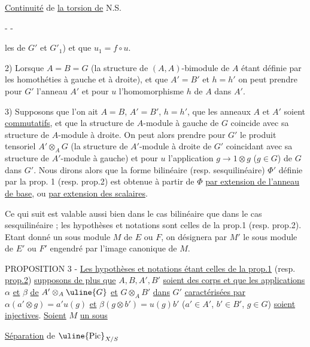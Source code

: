 \uline{Continuité} de \uline{la torsion de} N.S.


-  -

les de $G'$ et $G'_1$) et que $u_1=f\circ u$.

2) Lorsque $A=B=G$ (la structure de $(A,A)$-bimodule de $A$ étant définie par les homothéties à gauche et à droite), et que $A'=B'$ et $h=h'$ on peut prendre pour $G'$ l'anneau $A'$ et pour $u$ l'homomorphisme $h$ de $A$ dans $A'$.

3) Supposons que l'on ait $A=B$, $A'=B'$, $h=h'$, que les anneaux $A$ et $A'$ soient \uline{commutatifs}, et que la structure de $A$-module à gauche de $G$ coincide avec sa structure de $A$-module à droite. On peut alors prendre pour $G'$ le produit tensoriel $A'\otimes_A G$ (la structure de $A'$-module à droite de $G'$ coincidant avec sa structure de $A'$-module à gauche) et pour $u$ l'application $g\to1\otimes g$ ($g\in G$) de $G$ dans $G'$. Nous dirons alors que la forme bilinéaire (resp. sesquilinéaire) $\Phi'$ définie par la prop. 1 (resp. prop.2) est obtenue à partir de $\Phi$ \uline{par extension de l'anneau de base}, ou \uline{par extension des scalaires}.

Ce qui suit est valable aussi bien dans le cas bilinéaire que dans le cas sesquilinéaire ; les hypothèses et notations sont celles de la prop.1 (resp. prop.2). Etant donné un sous module $M$ de $E$ ou $F$, on désignera par $M'$ le sous module de $E'$ ou $F'$ engendré par l'image canonique de $M$.

PROPOSITION 3 - \uline{Les hypothèses et notations étant celles de la prop.1} (resp. \uline{prop.2}) \uline{supposons de plus que} $A,B,A',B'$ \uline{soient des corps et que les applications} $\alpha$ \uline{et} $\beta$ \uline{de} $A'\otimes_A \uline{G}$ \uline{et} $G\otimes_A B'$ \uline{dans} $G'$ \uline{caractérisées par} $\alpha(a'\otimes g)=a'u(g)$ \uline{et} $\beta(g\otimes b')=u(g)b'$ ($a'\in A'$, $b'\in B'$, $g\in G$) \uline{soient injectives}. \uline{Soient} $M$ \uline{un sous}

\uline{Séparation} de $\uline{\mathrm{Pic}}_{X/S}$

